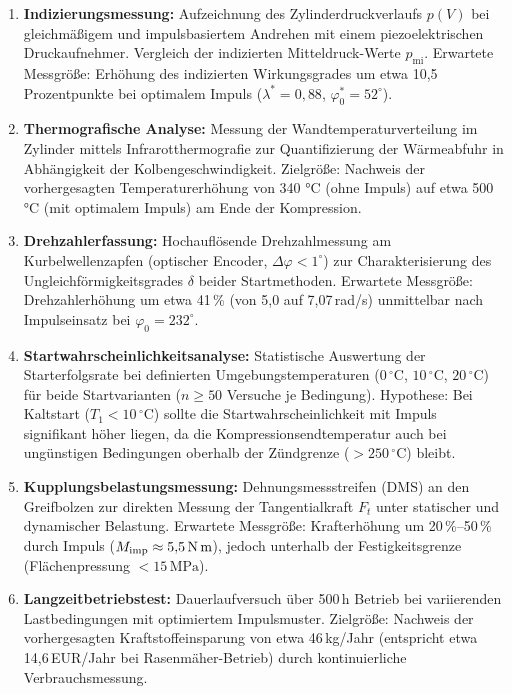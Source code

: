 ﻿\documentclass[a4paper,12pt]{article}
\begin{document}
\begin{enumerate}
  \item \textbf{Indizierungsmessung:} Aufzeichnung des Zylinderdruckverlaufs $p(V)$
    bei gleichmäßigem und impulsbasiertem Andrehen mit einem piezoelektrischen
    Druckaufnehmer. Vergleich der indizierten Mitteldruck-Werte $p_\text{mi}$.
    Erwartete Messgröße: Erhöhung des indizierten Wirkungsgrades um etwa
    10,5 Prozentpunkte bei optimalem Impuls ($\lambda^* = 0{,}88$,
    $\varphi_0^* = 52^\circ$).

  \item \textbf{Thermografische Analyse:} Messung der Wandtemperaturverteilung
    im Zylinder mittels Infrarotthermografie zur Quantifizierung der Wärmeabfuhr
    in Abhängigkeit der Kolbengeschwindigkeit. Zielgröße: Nachweis der
    vorhergesagten Temperaturerhöhung von 340 °C (ohne Impuls) auf etwa
    500 °C (mit optimalem Impuls) am Ende der Kompression.

  \item \textbf{Drehzahlerfassung:} Hochauflösende Drehzahlmessung am Kurbelwellenzapfen
    (optischer Encoder, $\Delta\varphi < 1^\circ$) zur Charakterisierung des Ungleichförmigkeitsgrades
    $\delta$ beider Startmethoden. Erwartete Messgröße: Drehzahlerhöhung um etwa
    41\,\% (von 5,0 auf 7,07\,rad/s) unmittelbar nach Impulseinsatz bei
    $\varphi_0 = 232^\circ$.

  \item \textbf{Startwahrscheinlichkeitsanalyse:} Statistische Auswertung der Starterfolgsrate
    bei definierten Umgebungstemperaturen ($0\,^\circ\text{C}$, $10\,^\circ\text{C}$,
    $20\,^\circ\text{C}$) für beide Startvarianten ($n \geq 50$ Versuche je Bedingung).
    Hypothese: Bei Kaltstart ($T_1 < 10\,^\circ\text{C}$) sollte die Startwahrscheinlichkeit
    mit Impuls signifikant höher liegen, da die Kompressionsendtemperatur auch bei
    ungünstigen Bedingungen oberhalb der Zündgrenze ($>250\,^\circ\text{C}$) bleibt.

  \item \textbf{Kupplungsbelastungsmessung:} Dehnungsmessstreifen (DMS) an den
    Greifbolzen zur direkten Messung der Tangentialkraft $F_t$ unter statischer
    und dynamischer Belastung. Erwartete Messgröße: Krafterhöhung um 20\,\%--50\,\%
    durch Impuls ($M_\text{imp} \approx 5{,}5\,\text{N\,m}$), jedoch unterhalb
    der Festigkeitsgrenze (Flächenpressung $<15\,\text{MPa}$).

  \item \textbf{Langzeitbetriebstest:} Dauerlaufversuch über 500\,h Betrieb
    bei variierenden Lastbedingungen mit optimiertem Impulsmuster. Zielgröße:
    Nachweis der vorhergesagten Kraftstoffeinsparung von etwa 46\,kg/Jahr
    (entspricht etwa 14,6\,EUR/Jahr bei Rasenmäher-Betrieb) durch
    kontinuierliche Verbrauchsmessung.
\end{enumerate}
\end{document}
